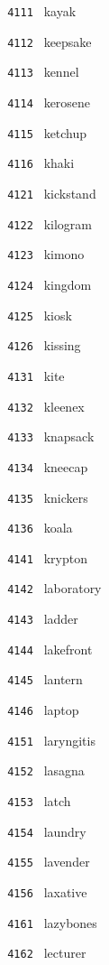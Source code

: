 \documentclass[11pt]{article}
\begin{document}
\begin{multicols}{6}
\small
\noindent \texttt{ 4111 } kayak  \par
\noindent \texttt{ 4112 } keepsake  \par
\noindent \texttt{ 4113 } kennel  \par
\noindent \texttt{ 4114 } kerosene  \par
\noindent \texttt{ 4115 } ketchup  \par
\noindent \texttt{ 4116 } khaki  \par
\noindent \texttt{ 4121 } kickstand  \par
\noindent \texttt{ 4122 } kilogram  \par
\noindent \texttt{ 4123 } kimono  \par
\noindent \texttt{ 4124 } kingdom  \par
\noindent \texttt{ 4125 } kiosk  \par
\noindent \texttt{ 4126 } kissing  \par
\noindent \texttt{ 4131 } kite  \par
\noindent \texttt{ 4132 } kleenex  \par
\noindent \texttt{ 4133 } knapsack  \par
\noindent \texttt{ 4134 } kneecap  \par
\noindent \texttt{ 4135 } knickers  \par
\noindent \texttt{ 4136 } koala  \par
\noindent \texttt{ 4141 } krypton  \par
\noindent \texttt{ 4142 } laboratory  \par
\noindent \texttt{ 4143 } ladder  \par
\noindent \texttt{ 4144 } lakefront  \par
\noindent \texttt{ 4145 } lantern  \par
\noindent \texttt{ 4146 } laptop  \par
\noindent \texttt{ 4151 } laryngitis  \par
\noindent \texttt{ 4152 } lasagna  \par
\noindent \texttt{ 4153 } latch  \par
\noindent \texttt{ 4154 } laundry  \par
\noindent \texttt{ 4155 } lavender  \par
\noindent \texttt{ 4156 } laxative  \par
\noindent \texttt{ 4161 } lazybones  \par
\noindent \texttt{ 4162 } lecturer  \par

\end{multicols}
\end{document}
